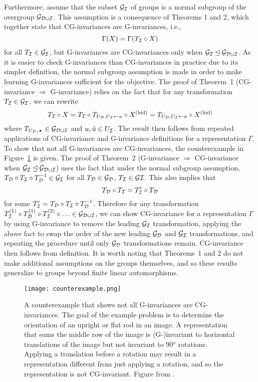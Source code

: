 Furthermore, \citeauthor{Mouli:2021} assume that the subset $\mathcal{G}_{\mathcal{I}}$ of groups is a normal subgroup of the overgroup $\mathcal{G}_{\mathcal{D}\cup\mathcal{I}}$. This assumption is a consequence of Theorems 1 and 2, which together state that CG-invariances are G-invariances, i.e.,
\[
\Gamma(X)=\Gamma(T_{\mathcal{I}}\circ X)
\]
for all $T_{\mathcal{I}}\in\mathcal{G}_{\mathcal{I}}$, but G-invariances are CG-invariances only when $\mathcal{G}_{\mathcal{I}}\unlhd\mathcal{G}_{\mathcal{D}\cup\mathcal{I}}$. As it is easier to check G-invariances than CG-invariances in practice due to its simpler definition, the normal subgroup assumption is made in order to make learning G-invariances sufficient for the objective. The proof of Theorem~1 (CG-invariance $\Rightarrow$ G-invariance) relies on the fact that for any transformation $T_{\mathcal{I}}\in\mathcal{G}_{\mathcal{I}}$, we can rewrite
\[
T_{\mathcal{I}}\circ X = T_{\mathcal{I}}\circ T_{U_{\mathcal{D}},U_{\mathcal{I}}\leftarrow u}\circ X^\text{(hid)} = T_{U_{\mathcal{D}},U_{\mathcal{I}}\leftarrow\tilde{u}}\circ X^\text{(hid)}
\]
where $T_{U_\calD,\argdot}\in\calG_{\calD\cup\calI}$ and $u,\tilde{u}\in U_{\mathcal{I}}$. The result then follows from repeated applications of CG-invariance and G-invariance definitions for a representation $\Gamma$. To show that not all G-invariances are CG-invariances, the counterexample in Figure~\ref{fig:counterexample} is given. The proof of Theorem~2 (G-invariance $\Rightarrow$ CG-invariance when $\mathcal{G}_{\mathcal{I}}\unlhd\mathcal{G}_{\mathcal{D}\cup\mathcal{I}}$) uses the fact that under the normal subgroup assumption, $T_{\mathcal{D}}\circ T_{\mathcal{I}}\circ T_{\mathcal{D}}^{-1}\in\mathcal{G}_{\mathcal{I}}$ for all $T_{\mathcal{D}}\in\mathcal{G}_{\mathcal{D}}$, $T_{\mathcal{I}}\in\mathcal{G}\mathcal{I}$. This also implies that
\[
T_{\mathcal{D}}\circ T_{\mathcal{I}} = T_{\mathcal{I}}'\circ T_{\mathcal{D}}
\]
for some $T_{\mathcal{I}}'=T_{\mathcal{D}}\circ T_{\mathcal{I}}\circ T_{\mathcal{D}}^{-1}$. Therefore for any transformation $T_{\mathcal{I}}^{(1)}\circ T_{\mathcal{D}}^{(1)}\circ T_{\mathcal{I}}^{(2)}\circ\ldots\in\mathcal{G}_{\mathcal{D}\cup\mathcal{I}}$, we can show CG-invariance for a representation $\Gamma$ by using G-invariance to remove the leading $\mathcal{G}_{\mathcal{I}}$ transformation, applying the above fact to swap the order of the new leading $\mathcal{G}_{\mathcal{D}}$ and $\mathcal{G}_{\mathcal{I}}$ transformations, and repeating the procedure until only $\mathcal{G}_{\mathcal{D}}$ transformations remain. CG-invariance then follows from definition. It is worth noting that Theorems~1 and 2 do not make additional assumptions on the groups themselves, and so these results generalize to groups beyond finite linear automorphisms.
\begin{figure}[H]
\centering
\texttt{[image: counterexample.png]}
\caption{A counterexample that shows not all G-invariances are CG-invariances. The goal of the example problem is to determine the orientation of an upright or flat rod in an image. A representation that sums the middle row of the image is (G-)invariant to horizontal translations of the image but not invariant to 90$^o$ rotations. Applying a translation before a rotation may result in a representation different from just applying a rotation, and so the representation is not CG-invariant. Figure from \parencite{Mouli:2021}.}
\label{fig:counterexample}
\end{figure}

